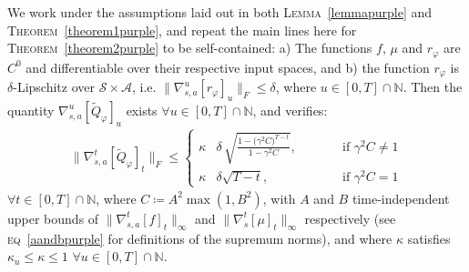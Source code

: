 \begin{theorem}
\label{theorem2purple}
We work under the assumptions laid out in
both \textsc{Lemma}~\ref{lemmapurple} and \textsc{Theorem}~\ref{theorem1purple}, and repeat
the main lines here
for \textsc{Theorem}~\ref{theorem2purple} to be self-contained:
a) The functions $f$, $\mu$ and $r_\varphi$ are $C^0$ and differentiable
over their respective input spaces,
and b) the function $r_\varphi$ is $\delta$-Lipschitz
over $\mathcal{S} \times \mathcal{A}$, i.e.
$\lVert \nabla_{s,a}^u[r_\varphi]_u \rVert _F \leq \delta$,
where $u \in [0, T] \cap \mathbb{N}$.
Then the quantity $\nabla_{s,a}^u[\widetilde{Q}_\varphi]_u$ exists
$\forall u \in [0, T] \cap \mathbb{N}$,
and verifies:
\begin{align}
\lVert \nabla_{s,a}^t[\widetilde{Q}_\varphi]_t \rVert _F
\leq
\left\{
\begin{aligned}
\kappa &\delta \, \sqrt{\frac{1 - \big( \gamma^2 C \big)^{T - t}}{1 - \gamma^2 C}},
&\qquad  &\text{if $\gamma^2 C \neq 1$} \\
\kappa &\delta\sqrt{T - t},
&\qquad &\text{if $\gamma^2 C = 1$}
\end{aligned}
\right.
\end{align}
$\forall t \in [0, T] \cap \mathbb{N}$,
where
$C \coloneqq A^2 \max(1, B^2)$, with $A$ and $B$ time-independent upper bounds of
$\lVert\nabla_{s,a}^t[f]_t\rVert _\infty$ and $\lVert\nabla_s^t[\mu]_t\rVert _\infty$
respectively
(see \textsc{eq}~\ref{aandbpurple} for definitions of the supremum norms),
and where $\kappa$ satisfies $\kappa_u \leq \kappa \leq 1$ $\forall u \in [0, T] \cap \mathbb{N}$.
\end{theorem}

